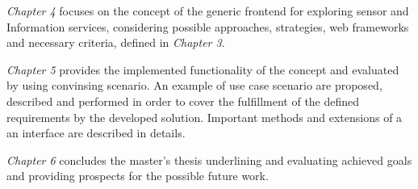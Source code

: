 \emph{Chapter 4} focuses on the concept of the generic frontend for exploring sensor and Information services, considering possible approaches, strategies, web frameworks and necessary criteria, defined in \emph{Chapter 3}.

\emph{Chapter 5} provides the implemented functionality of the concept and evaluated by using convinsing scenario. An example of use case scenario are proposed, described and performed in order to cover the fulfillment of the defined requirements by the developed solution. Important methods and extensions of a an interface are described in details.

\emph{Chapter 6} concludes the master's thesis underlining and evaluating achieved goals and providing prospects for the possible future work.  
